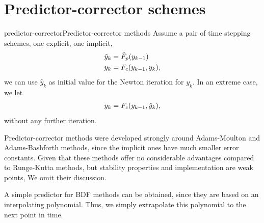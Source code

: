 \section{Predictor-corrector schemes}

\begin{Definition*}{predictor-corrector}{Predictor-corrector methods}
  Assume a pair of time stepping schemes, one explicit, one implicit,
  \begin{align*}
    \hat y_{k} &= \hat {F}_p(y_{k-1}) \\
    y_k &= F_c(y_{k-1},y_{k}),
  \end{align*}
  we can use $\hat y_k$ as initial value for the Newton iteration for
  $y_k$. In an extreme case, we let
  \begin{gather*}
    y_k = F_c(y_{k-1},\hat y_{k}),
  \end{gather*}
  without any further iteration.
\end{Definition*}

\begin{remark}
  Predictor-corrector methods were developed strongly around
  Adams-Moulton and Adams-Bashforth methods, since the implicit ones
  have much smaller error constants. Given that these methods offer no
  considerable advantages compared to Runge-Kutta methods, but
  stability properties and implementation are weak points, We omit
  their discussion.

  A simple predictor for BDF methods can be obtained, since they are
  based on an interpolating polynomial. Thus, we simply extrapolate
  this polynomial to the next point in time.
\end{remark}


